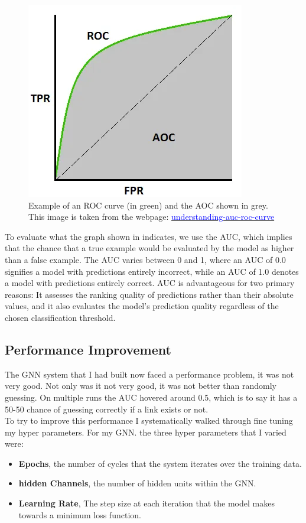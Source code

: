 \documentclass{l4proj}
\begin{document}
\begin{figure}[h]
    \centering
    \includegraphics[width=0.5\linewidth]{images/roc_auc.png}
    \caption{Example of an ROC curve (in green) and the AOC shown in grey. This image is taken from the webpage: \href{https://towardsdatascience.com/understanding-auc-roc-curve-68b2303cc9c5}{\textcolor{blue}{understanding-auc-roc-curve}}}
    \label{fig:roc_auc}
\end{figure}

To evaluate what the graph shown in  indicates, we use the AUC, which implies that the chance that a true example would be evaluated by the model as higher than a false example. The AUC varies between 0 and 1, where an AUC of 0.0 signifies a model with predictions entirely incorrect, while an AUC of 1.0 denotes a model with predictions entirely correct. AUC is advantageous for two primary reasons: It assesses the ranking quality of predictions rather than their absolute values, and it also evaluates the model's prediction quality regardless of the chosen classification threshold. \\

\subsection{Performance Improvement}

The GNN system that I had built now faced a performance problem, it was not very good. Not only was it not very good, it was not better than randomly guessing. On multiple runs the AUC hovered around 0.5, which is to say it has a 50-50 chance of guessing correctly if a link exists or not. \\

To try to improve this performance I systematically walked through fine tuning my hyper parameters. For my GNN. the three hyper parameters that I varied were:
\\
\begin{itemize}
    \item \textbf{Epochs}, the number of cycles that the system iterates over the training data.
    \item \textbf{hidden Channels}, the number of hidden units within the GNN.
    \item \textbf{Learning Rate}, The step size at each iteration that the model makes towards a minimum loss function.\\
\end{itemize}
\end{document}
